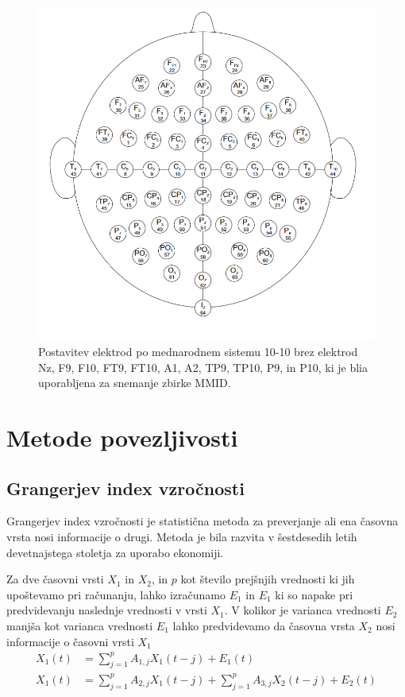 \begin{figure}[h!]
    \begin{center}
    \includegraphics[width=1\linewidth]{slike/64electrodeSystem.png}
    \end{center}
    \caption{Postavitev elektrod po mednarodnem sistemu 10-10 brez elektrod Nz, F9, F10, FT9, FT10, A1, A2, TP9, TP10, P9, in P10, ki je blia uporabljena za snemanje zbirke MMID.}
    \end{figure}
\section{Metode povezljivosti}
\subsection{Grangerjev index vzročnosti}
Grangerjev index vzročnosti je statistična metoda za preverjanje ali ena časovna vrsta nosi informacije o drugi. Metoda je bila razvita v šestdesedih letih devetnajstega stoletja za uporabo ekonomiji.

Za dve časovni vrsti $X_1$ in $X_2$, in $p$ kot število prejšnjih vrednosti ki jih upoštevamo pri računanju, lahko izračunamo $E_1$ in $E_1$ ki so napake pri predvidevanju naslednje vrednosti v vrsti $X_1$. V kolikor je varianca vrednosti $E_2$ manjša kot varianca vrednosti $E_1$ lahko predvidevamo da časovna vrsta $X_2$ nosi informacije o časovni vrsti $X_1$
\begin{align*}
X_1(t) &= \sum_{j=1}^{p} A_{1,j} X_1(t-j) + E_1(t)\\
X_1(t) &= \sum_{j=1}^{p} A_{2,j} X_1(t-j) + \sum_{j=1}^{p} A_{3,j} X_2(t-j) + E_2(t)
\end{align*}


